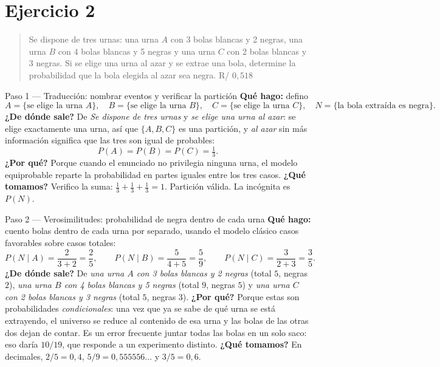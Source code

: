\documentclass[11pt]{article}
\begin{document}
\newpage
\section*{Ejercicio 2}

\begin{quote}
Se dispone de tres urnas: una urna $A$ con 3 bolas blancas y 2 negras, una urna $B$ con 4 bolas blancas y 5 negras y una urna $C$ con 2 bolas blancas y 3 negras. Si se elige una urna al azar y se extrae una bola, determine la probabilidad que la bola elegida al azar sea negra. \hfill R/ $0,518$
\end{quote}

\begin{sol}

\begin{paso}{Paso 1 --- Traducción: nombrar eventos y verificar la partición}
\textbf{Qué hago:} defino
\[
A=\{\text{se elige la urna }A\},\quad B=\{\text{se elige la urna }B\},\quad C=\{\text{se elige la urna }C\},\quad N=\{\text{la bola extraída es negra}\}.
\]
\textbf{¿De dónde sale?} De \emph{Se dispone de tres urnas} y \emph{se elige una urna al azar}: se elige exactamente una urna, así que $\{A,B,C\}$ es una partición, y \emph{al azar} sin más información significa que las tres son igual de probables:
\[
P(A)=P(B)=P(C)=\tfrac{1}{3}.
\]
\textbf{¿Por qué?} Porque cuando el enunciado no privilegia ninguna urna, el modelo equiprobable reparte la probabilidad en partes iguales entre los tres casos.
\textbf{¿Qué tomamos?} Verifico la suma: $\tfrac13+\tfrac13+\tfrac13=1$. Partición válida. La incógnita es $P(N)$.
\end{paso}

\begin{paso}{Paso 2 --- Verosimilitudes: probabilidad de negra dentro de cada urna}
\textbf{Qué hago:} cuento bolas dentro de cada urna por separado, usando el modelo clásico casos favorables sobre casos totales:
\[
P(N\mid A)=\frac{2}{3+2}=\frac{2}{5},\qquad
P(N\mid B)=\frac{5}{4+5}=\frac{5}{9},\qquad
P(N\mid C)=\frac{3}{2+3}=\frac{3}{5}.
\]
\textbf{¿De dónde sale?} De \emph{una urna $A$ con 3 bolas blancas y 2 negras} (total $5$, negras $2$), \emph{una urna $B$ con 4 bolas blancas y 5 negras} (total $9$, negras $5$) y \emph{una urna $C$ con 2 bolas blancas y 3 negras} (total $5$, negras $3$).
\textbf{¿Por qué?} Porque estas son probabilidades \emph{condicionales}: una vez que ya se sabe de qué urna se está extrayendo, el universo se reduce al contenido de esa urna y las bolas de las otras dos dejan de contar. Es un error frecuente juntar todas las bolas en un solo saco: eso daría $10/19$, que responde a un experimento distinto.
\textbf{¿Qué tomamos?} En decimales, $2/5=0,4$, $5/9=0,555556\ldots$ y $3/5=0,6$.
\end{paso}


\end{sol}
\end{document}
